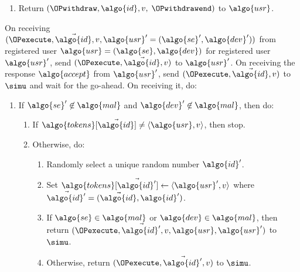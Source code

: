 \begin{framed}
\begin{enumerate}
\begin{enumerate}
\begin{enumerate}
		  \item Return $(\OPwithdraw, \algo{id}, v,$ $\OPwithdrawend)$
to $\algo{usr}$.

		\end{enumerate}

	    \end{enumerate}

	\end{enumerate}

	\fuinterface{\OPexecute} On receiving $(\OPexecute, \vec{\algo{id}}, v, \algo{usr}' =
(\algo{se}', \algo{dev}'))$ from registered user $\algo{usr} = (\algo{se},
\algo{dev})$ for registered user $\algo{usr}'$, send $(\OPexecute, \vec{\algo{id}},
v)$ to $\algo{usr}'$. On receiving the response $\algo{accept}$ from
$\algo{usr}'$, send $(\OPexecute, \vec{\algo{id}}, v)$ to $\simu$ and wait for the
go-ahead. On receiving it, do:

	\begin{enumerate}

	  \item If $\algo{se}' \not\in \algo{mal}$ and $\algo{dev}' \not\in
\algo{mal}$, then do:

	    \begin{enumerate}

	      \item If $\algo{tokens}[\vec{\algo{id}}] \neq \langle \algo{usr}, v
\rangle$, then stop.

	      \item Otherwise, do:

		\begin{enumerate}

		  \item Randomly select a unique random number $\algo{id}'$.

		  \item Set $\algo{tokens}[\vec{\algo{id}'}] \gets
\langle\algo{usr}', v \rangle$ where $\vec{\algo{id}'} = (\vec{\algo{id}}, \algo{id}')$.

		  \item If $\algo{se} \in \algo{mal}$ or $\algo{dev} \in
\algo{mal}$, then return $(\OPexecute, \vec{\algo{id}'}, v, \algo{usr}, \algo{usr}')$
to $\simu$.

		  \item Otherwise, return $(\OPexecute, \vec{\algo{id}'}, v)$ to
$\simu$.

		\end{enumerate}

	    \end{enumerate}


\end{enumerate}
\end{framed}
